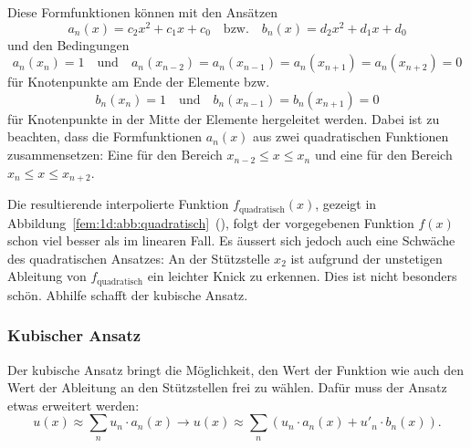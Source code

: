 Diese Formfunktionen können mit den Ansätzen 
\begin{equation*}
    a_n(x) = c_2x^2 + c_1x + c_0
    \quad \text{bzw.} \quad
    b_n(x) = d_2x^2 + d_1x + d_0
\end{equation*}
und den Bedingungen 
\begin{equation*}
    a_n(x_n) = 1 
    \quad \text{und} \quad 
    a_n(x_{n-2}) = a_n(x_{n-1}) = a_n(x_{n+1}) = a_n(x_{n+2}) = 0
\end{equation*}
für Knotenpunkte am Ende der Elemente bzw.
\begin{equation*}
    b_n(x_n) = 1
    \quad \text{und} \quad 
    b_n(x_{n-1}) = b_n(x_{n+1}) = 0
\end{equation*}
für Knotenpunkte in der Mitte der Elemente hergeleitet werden.
Dabei ist zu beachten, dass die Formfunktionen $a_n(x)$ aus zwei quadratischen Funktionen zusammensetzen: 
Eine für den Bereich $x_{n-2} \leq x \leq x_n$ und eine für den Bereich $x_n \leq x \leq x_{n+2}$.

Die resultierende interpolierte Funktion $f_\text{quadratisch} (x)$, gezeigt in Abbildung~\ref{fem:1d:abb:quadratisch}~(), folgt der vorgegebenen Funktion $f(x)$ schon viel besser als im linearen Fall.
Es äussert sich jedoch auch eine Schwäche des quadratischen Ansatzes: 
An der Stützstelle $x_2$ ist aufgrund der unstetigen Ableitung von $f_\text{quadratisch}$ ein leichter Knick zu erkennen.
Dies ist nicht besonders schön.
Abhilfe schafft der kubische Ansatz.

\subsubsection{Kubischer Ansatz}
%
%
%
Der kubische Ansatz bringt die Möglichkeit, den Wert der Funktion wie auch den Wert der Ableitung an den Stützstellen frei zu wählen.
Dafür muss der Ansatz etwas erweitert werden:
\begin{equation*}
    u(x) \approx \sum_{n}{u_n \cdot a_n(x)} \rightarrow u(x) \approx \sum_{n}{\left(u_n \cdot a_n(x) + u'_n \cdot b_n(x)\right)}.
\end{equation*}

